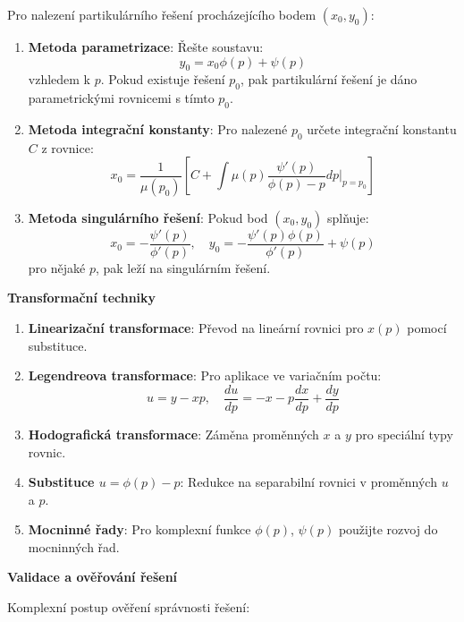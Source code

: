 Pro nalezení partikulárního řešení procházejícího bodem $(x_0, y_0)$:

\begin{enumerate}
\item \textbf{Metoda parametrizace}: Řešte soustavu:
\[
y_0 = x_0\phi(p) + \psi(p)
\]
vzhledem k $p$. Pokud existuje řešení $p_0$, pak partikulární řešení je dáno parametrickými rovnicemi s tímto $p_0$.

\item \textbf{Metoda integrační konstanty}: Pro nalezené $p_0$ určete integrační konstantu $C$ z rovnice:
\[
x_0 = \frac{1}{\mu(p_0)} \left[ C + \int \mu(p) \frac{\psi'(p)}{\phi(p) - p} dp \bigg|_{p=p_0} \right]
\]

\item \textbf{Metoda singulárního řešení}: Pokud bod $(x_0, y_0)$ splňuje:
\[
x_0 = -\frac{\psi'(p)}{\phi'(p)}, \quad y_0 = -\frac{\psi'(p)\phi(p)}{\phi'(p)} + \psi(p)
\]
pro nějaké $p$, pak leží na singulárním řešení.
\end{enumerate}

\vspace{1\baselineskip}

\noindent\textbf{Transformační techniky}

\begin{enumerate}
\item \textbf{Linearizační transformace}: Převod na lineární rovnici pro $x(p)$ pomocí substituce.

\item \textbf{Legendreova transformace}: Pro aplikace ve variačním počtu:
\[
u = y - xp, \quad \frac{du}{dp} = -x - p\frac{dx}{dp} + \frac{dy}{dp}
\]

\item \textbf{Hodografická transformace}: Záměna proměnných $x$ a $y$ pro speciální typy rovnic.

\item \textbf{Substituce $u = \phi(p) - p$}: Redukce na separabilní rovnici v proměnných $u$ a $p$.

\item \textbf{Mocninné řady}: Pro komplexní funkce $\phi(p)$, $\psi(p)$ použijte rozvoj do mocninných řad.
\end{enumerate}

\vspace{1\baselineskip}

\noindent\textbf{Validace a ověřování řešení}

Komplexní postup ověření správnosti řešení:

